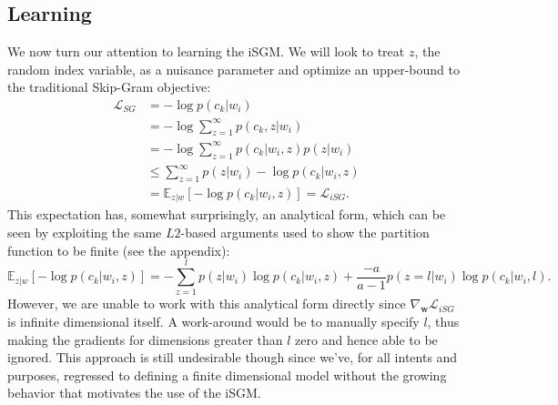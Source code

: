 \documentclass{article} %
\begin{document}
\subsection{Learning}
We now turn our attention to learning the iSGM.  We will look to treat $z$, the random index variable, as a nuisance parameter and optimize an upper-bound to the traditional Skip-Gram objective:\begin{equation}\begin{split}\label{iSGM_obj}
\mathcal{L}_{SG} &= - \log p(c_{k} | w_{i}) \\ &= - \log \sum_{z=1}^{\infty} p(c_{k}, z| w_{i}) \\ &= - \log \sum_{z=1}^{\infty} p(c_{k}| w_{i}, z) p(z | w_{i}) \\ &\le  \sum_{z=1}^{\infty} p(z | w_{i}) -\log p(c_{k}| w_{i}, z) \\ &= \mathbb{E}_{z|w}[- \log p( c_{k}| w_{i}, z)] = \mathcal{L}_{iSG}. \end{split}\end{equation}  This expectation has, somewhat surprisingly, an analytical form, which can be seen by exploiting the same $L2$-based arguments used to show the partition function to be finite (see the appendix): $$\mathbb{E}_{z|w}[- \log p( c_{k}| w_{i}, z)] = -\sum_{z=1}^{l} p(z | w_{i})  \log p(c_{k}|w_{i},z) + \frac{-a}{a-1} p(z=l | w_{i}) \log p(c_{k} | w_{i}, l). $$  However, we are unable to work with this analytical form directly since $\nabla_{\mathbf{w}} \mathcal{L}_{iSG}$ is infinite dimensional itself.  A work-around would be to manually specify $l$, thus making the gradients for dimensions greater than $l$ zero and hence able to be ignored.  This approach is still undesirable though since we've, for all intents and purposes, regressed to defining a finite dimensional model without the growing behavior that motivates the use of the iSGM.      
\end{document}
